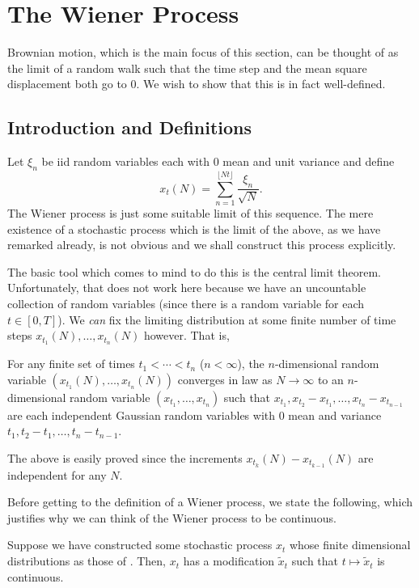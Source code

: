 \section{The Wiener Process}

Brownian motion, which is the main focus of this section, can be thought of as the limit of a random walk such that the time step and the mean square displacement both go to $0$. We wish to show that this is in fact well-defined.

\subsection{Introduction and Definitions}

Let $\xi_n$ be iid random variables each with $0$ mean and unit variance and define
\[ x_t(N) = \sum_{n=1}^{\lfloor Nt\rfloor} \frac{\xi_n}{\sqrt{N}}. \]
The Wiener process is just some suitable limit of this sequence. The mere existence of a stochastic process which is the limit of the above, as we have remarked already, is not obvious and we shall construct this process explicitly.

The basic tool which comes to mind to do this is the central limit theorem. Unfortunately, that does not work here because we have an uncountable collection of random variables (since there is a random variable for each $t\in[0,T]$). We \textit{can} fix the limiting distribution at some finite number of time steps $x_{t_1}(N),\ldots,x_{t_n}(N)$ however. That is,

\begin{lemma}
	\label{finite wiener}
	For any finite set of times $t_1<\cdots<t_n$ ($n<\infty$), the $n$-dimensional random variable $(x_{t_1}(N),\ldots,x_{t_n}(N))$ converges in law as $N\to\infty$ to an $n$-dimensional random variable $(x_{t_1},\ldots,x_{t_n})$ such that $x_{t_1}, x_{t_2}-x_{t_1},\ldots,x_{t_n}-x_{t_{n-1}}$ are each independent Gaussian random variables with $0$ mean and variance $t_1,t_2-t_1,\ldots,t_{n}-t_{n-1}$.
\end{lemma}

The above is easily proved since the increments $x_{t_k}(N) - x_{t_{k-1}}(N)$ are independent for any $N$.

Before getting to the definition of a Wiener process, we state the following, which justifies why we can think of the Wiener process to be continuous.

\begin{lemma}
	Suppose we have constructed some stochastic process $x_t$ whose finite dimensional distributions as those of . Then, $x_t$ has a modification $\tilde{x}_t$ such that $t\mapsto\tilde{x}_t$ is continuous.
\end{lemma}

